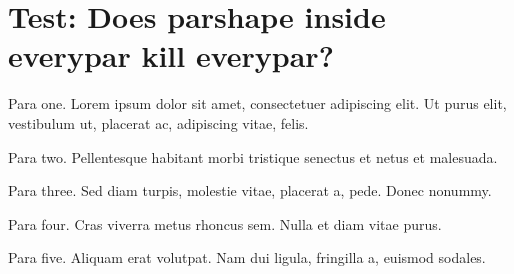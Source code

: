 \documentclass[11pt,a4paper]{article}
\begin{document}
\section{Test: Does parshape inside everypar kill everypar?}

%

Para one. Lorem ipsum dolor sit amet, consectetuer adipiscing elit. Ut purus elit, vestibulum ut, placerat ac, adipiscing vitae, felis.

Para two. Pellentesque habitant morbi tristique senectus et netus et malesuada.

Para three. Sed diam turpis, molestie vitae, placerat a, pede. Donec nonummy.

Para four. Cras viverra metus rhoncus sem. Nulla et diam vitae purus.

Para five. Aliquam erat volutpat. Nam dui ligula, fringilla a, euismod sodales.

\everypar{}%
\end{document}
